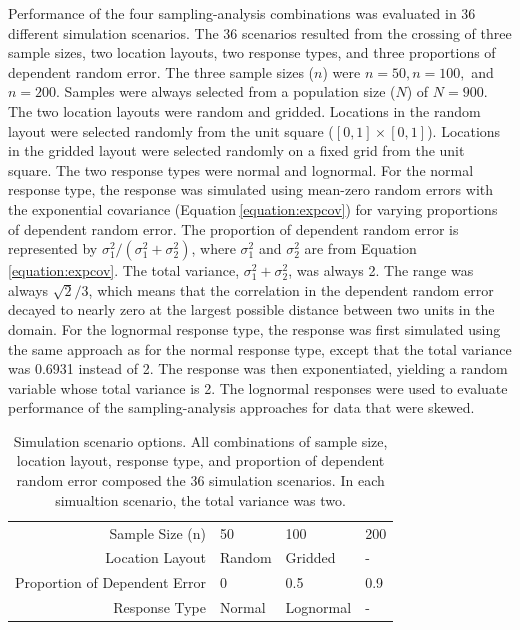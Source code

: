 \documentclass[]{elsarticle} %
\begin{document}
Performance of the four sampling-analysis combinations was evaluated in
36 different simulation scenarios. The 36 scenarios resulted from the
crossing of three sample sizes, two location layouts, two response
types, and three proportions of dependent random error. The three sample
sizes (\(n\)) were \(n = 50, n = 100,\) and \(n = 200\). Samples were
always selected from a population size (\(N\)) of \(N = 900\). The two
location layouts were random and gridded. Locations in the random layout
were selected randomly from the unit square (\([0, 1] \times [0, 1]\)).
Locations in the gridded layout were selected randomly on a fixed grid
from the unit square. The two response types were normal and lognormal.
For the normal response type, the response was simulated using mean-zero
random errors with the exponential covariance
(Equation\(~\)\ref{equation:expcov}) for varying proportions of
dependent random error. The proportion of dependent random error is
represented by \(\sigma^2_1 / (\sigma^2_1 + \sigma^2_2)\), where
\(\sigma^2_1\) and \(\sigma^2_2\) are from
Equation\(~\)\ref{equation:expcov}. The total variance,
\(\sigma^2_1 + \sigma^2_2\), was always 2. The range was always
\(\sqrt{2} / 3\), which means that the correlation in the dependent
random error decayed to nearly zero at the largest possible distance
between two units in the domain. For the lognormal response type, the
response was first simulated using the same approach as for the normal
response type, except that the total variance was 0.6931 instead of 2.
The response was then exponentiated, yielding a random variable whose
total variance is 2. The lognormal responses were used to evaluate
performance of the sampling-analysis approaches for data that were
skewed.

\begin{table}[ht]
\centering
\begin{tabular}{r|lll}
   \hline
Sample Size (n) & 50 & 100 & 200 \\ 
  Location Layout & Random & Gridded & - \\ 
  Proportion of Dependent Error & 0 & 0.5 & 0.9 \\ 
  Response Type & Normal & Lognormal & - \\ 
   \hline
\end{tabular}
\caption{\label{tab:parmtab} Simulation scenario options. All combinations of sample size, location layout, response type, and proportion of dependent random error composed the 36 simulation scenarios. In each simualtion scenario, the total variance was two.} 
\end{table}
\end{document}
